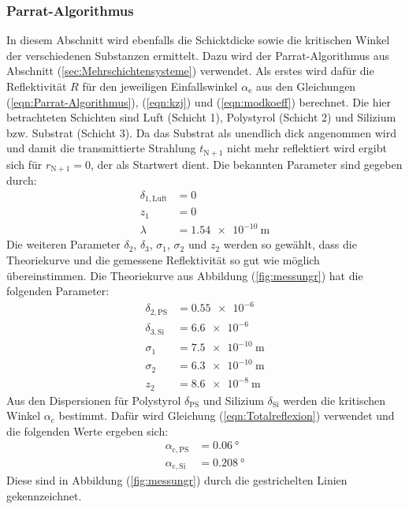 \subsubsection{Parrat-Algorithmus}
In diesem Abschnitt wird ebenfalls die Schicktdicke sowie die kritischen Winkel der verschiedenen Substanzen ermittelt. Dazu wird der Parrat-Algorithmus aus Abschnitt (\ref{sec:Mehrschichtensysteme}) verwendet.
Als erstes wird dafür die Reflektivität $R$ für den jeweiligen Einfallswinkel $\alpha_\mathrm{e}$ aus den Gleichungen (\ref{eqn:Parrat-Algorithmus}), (\ref{eqn:kzj}) und (\ref{eqn:modkoeff}) berechnet.
Die hier betrachteten Schichten sind Luft (Schicht 1), Polystyrol (Schicht 2) und Silizium bzw. Substrat (Schicht 3). Da das Substrat als unendlich dick angenommen wird und damit die transmittierte Strahlung $t_\mathrm{N+1}$ nicht mehr reflektiert wird ergibt sich für $r_\mathrm{N+1}=0$, der als Startwert dient. Die bekannten Parameter sind gegeben durch:
\begin{align*}
  \delta_\mathrm{1,Luft}&=0 \\
  z_\mathrm{1}&=0 \\
  \lambda&=\SI{1.54 e-10}{\meter}
\end{align*}
Die weiteren Parameter $\delta_\mathrm{2}$, $\delta_\mathrm{3}$, $\sigma_\mathrm{1}$, $\sigma_\mathrm{2}$ und $z_\mathrm{2}$ werden so gewählt, dass die Theoriekurve und die gemessene Reflektivität so gut wie möglich übereinstimmen.
Die Theoriekurve aus Abbildung (\ref{fig:messungr}) hat die folgenden Parameter:
\begin{align*}
  \delta_\mathrm{2,PS} &=\SI{0.55 e-6}{} \\
  \delta_\mathrm{3,Si} &=\SI{6.6 e-6}{} \\
  \sigma_\mathrm{1} &=\SI{7.5 e-10}{\meter} \\
  \sigma_\mathrm{2} &=\SI{6.3 e-10}{\meter} \\
  z_\mathrm{2} &=\SI{8.6 e-8}{\meter}
\end{align*}
Aus den  Dispersionen für Polystyrol $\delta_\mathrm{PS}$ und Silizium $\delta_\mathrm{Si}$ werden die kritischen Winkel $\alpha_\mathrm{c}$ bestimmt. Dafür wird Gleichung (\ref{eqn:Totalreflexion}) verwendet und die folgenden Werte ergeben sich:
\begin{align*}
  \alpha_\mathrm{c,PS} &=\SI{0.06}{\degree} \\
  \alpha_\mathrm{c,Si} &=\SI{0.208}{\degree}
\end{align*}
Diese sind in Abbildung (\ref{fig:messungr}) durch die gestrichelten Linien gekennzeichnet.
